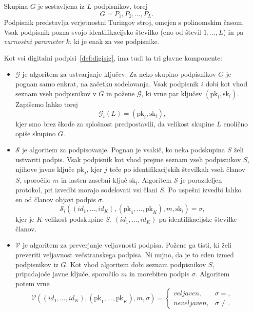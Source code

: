 \documentclass[isrm2, tisk]{fmfdelo}
\begin{document}
\begin{definicija} 
    Skupina $G$ je sestavljena iz $L$ podpisnikov, torej
    $$ 
    G = P_1, P_2, \dots, P_L.
    $$
    Podpisnik predstavlja verjetnostni Turingov stroj, omejen s polinomskim časom. Vsak podpisnik pozna 
    svojo identifikacijsko številko (eno od števil $1, \dots, L$) in pa \textit{varnostni parameter} $k$, 
    ki je enak za vse podpisnike.

    Kot vsi digitalni podpisi~\ref{def:digisig}, ima tudi ta tri glavne komponente: 
    \begin{itemize}
        \item $\mathcal{G}$ je algoritem za ustvarjanje ključev. Za neko skupino podpisnikov $G$ je pognan samo 
            enkrat, na začetku sodelovanja. Vsak podpisnik $i$ dobi kot vhod seznam vseh podpisnikov v $G$ 
            in požene $\mathcal{G}$, ki vrne par ključev $(\text{pk}_i, \text{sk}_i)$. Zapišemo lahko torej 
            $$ 
            \mathcal{G}_i(L) = (\text{pk}_i, \text{sk}_i),
            $$
            kjer smo brez škode za splošnost predpostavili, da velikost skupine $L$ enolično opiše 
            skupino $G$.
        \item $\mathcal{S}$ je algoritem za podpisovanje. Pognan je vsakič, ko neka podskupina $S$ želi 
            ustvariti podpis. Vsak podpisnik kot vhod prejme seznam vseh podpisnikov $S$, njihove 
            javne ključe $\text{pk}_j$, kjer $j$ teče po identifikacijskih številkah vseh članov $S$, 
            sporočilo $m$ in lasten zasebni ključ $\text{sk}_i$. Algoritem $\mathcal{S}$ je porazdeljen 
            protokol, pri izvedbi morajo sodelovati vsi člani $S$. Po uspešni izvedbi lahko en od članov 
            objavi podpis $\sigma$.
            $$ 
            \mathcal{S}_i((id_1, \dots, id_K), (\text{pk}_1, \dots, \text{pk}_K), m, \text{sk}_i) = \sigma,
            $$
            kjer je $K$ velikost podskupine $S$, $(id_1, \dots, id_K)$ pa identifikacijske številke 
            članov.
        \item $\mathcal{V}$ je algoritem za preverjanje veljavnosti podpisa. Požene ga tisti, ki želi 
            preveriti veljavnost večstranskega podpisa. Ni nujno, da je to eden izmed podpisnikov iz $G$. 
            Kot vhod algoritem dobi seznam podpisnikov $S$, pripadajoče javne ključe, sporočilo $m$ in 
            morebiten podpis $\sigma$. Algoritem potem vrne
            $$ 
            \mathcal{V}((id_1, \dots, id_K), (\text{pk}_1, \dots, \text{pk}_K), m, \sigma) = 
            \begin{cases}
                veljaven, & \sigma = , \\
                neveljaven, & \sigma \neq .
            \end{cases}
            $$
    \end{itemize}
\end{definicija}
\end{document}
